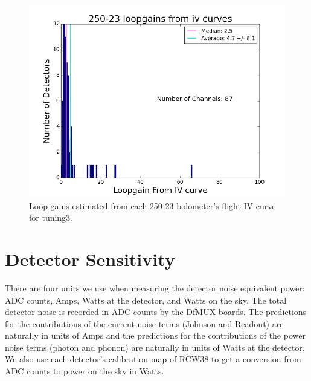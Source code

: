 \begin{figure}[htbp]
\begin{center}
\includegraphics[width=0.5 \textwidth]{figures/250-23_loopgains_from_iv_tuning3.png}
\caption{Loop gains estimated from each 250-23 bolometer's flight IV curve for tuning3.}
\label{fig:loopgain_from_iv_hist}
\end{center}
\end{figure}


%
%
%
\section{Detector Sensitivity}
\label{sensitivity}
%
There are four units we use when measuring the detector noise equivalent power: ADC counts, Amps, Watts at the detector, and Watts on the sky. 
The total detector noise is recorded in ADC counts by the DfMUX boards. 
The predictions for the contributions of the current noise terms (Johnson and Readout) are naturally in units of Amps and the predictions for the contributions of the power noise terms (photon and phonon) are naturally in units of Watts at the detector. 
We also use each detector's calibration map of RCW38 to get a conversion from ADC counts to power on the sky in Watts.

